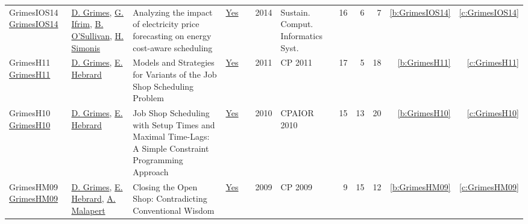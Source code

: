 {\begin{longtable}{>{\raggedright\arraybackslash}p{3cm}>{\raggedright\arraybackslash}p{6cm}>{\raggedright\arraybackslash}p{6.5cm}rrrp{2.5cm}rrrrr}
GrimesIOS14 \href{https://doi.org/10.1016/j.suscom.2014.08.009}{GrimesIOS14} & \hyperref[auth:a183]{D. Grimes}, \hyperref[auth:a184]{G. Ifrim}, \hyperref[auth:a16]{B. O'Sullivan}, \hyperref[auth:a17]{H. Simonis} & Analyzing the impact of electricity price forecasting on energy cost-aware scheduling & \href{works/GrimesIOS14.pdf}{Yes} & \cite{GrimesIOS14} & 2014 & Sustain. Comput. Informatics Syst. & 16 & 6 & 7 & \ref{b:GrimesIOS14} & \ref{c:GrimesIOS14}\\
GrimesH11 \href{https://doi.org/10.1007/978-3-642-23786-7\_28}{GrimesH11} & \hyperref[auth:a183]{D. Grimes}, \hyperref[auth:a1]{E. Hebrard} & Models and Strategies for Variants of the Job Shop Scheduling Problem & \href{works/GrimesH11.pdf}{Yes} & \cite{GrimesH11} & 2011 & CP 2011 & 17 & 5 & 18 & \ref{b:GrimesH11} & \ref{c:GrimesH11}\\
GrimesH10 \href{https://doi.org/10.1007/978-3-642-13520-0\_19}{GrimesH10} & \hyperref[auth:a183]{D. Grimes}, \hyperref[auth:a1]{E. Hebrard} & Job Shop Scheduling with Setup Times and Maximal Time-Lags: {A} Simple Constraint Programming Approach & \href{works/GrimesH10.pdf}{Yes} & \cite{GrimesH10} & 2010 & CPAIOR 2010 & 15 & 13 & 20 & \ref{b:GrimesH10} & \ref{c:GrimesH10}\\
GrimesHM09 \href{https://doi.org/10.1007/978-3-642-04244-7\_33}{GrimesHM09} & \hyperref[auth:a183]{D. Grimes}, \hyperref[auth:a1]{E. Hebrard}, \hyperref[auth:a82]{A. Malapert} & Closing the Open Shop: Contradicting Conventional Wisdom & \href{works/GrimesHM09.pdf}{Yes} & \cite{GrimesHM09} & 2009 & CP 2009 & 9 & 15 & 12 & \ref{b:GrimesHM09} & \ref{c:GrimesHM09}\\
\end{longtable}
}

